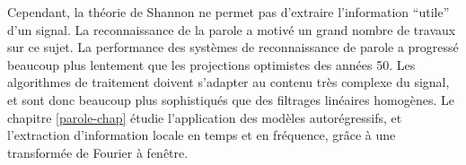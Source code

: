 Cependant, la th\'eorie de Shannon ne permet pas d'extraire
l'information ``utile'' d'un signal.
La reconnaissance de la parole a
motiv\'e un grand nombre de travaux
sur ce sujet.
La performance des syst\`emes de reconnaissance de parole
a progress\'e beaucoup plus lentement que les
projections optimistes des ann\'ees 50.
Les algorithmes de traitement doivent
s'adapter au contenu tr\`es complexe du
signal, et sont donc beaucoup plus sophistiqu\'es que des filtrages
lin\'eaires homog\`enes.
Le chapitre \ref{parole-chap} \'etudie
l'application des mod\`eles autor\'egressifs, et
l'extraction d'information
locale en temps et en fr\'equence,
gr\^ace \`a une transform\'ee de Fourier \`a fen\^etre.


